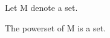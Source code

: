 \begin{forthel}

  Let M denote a set.

  \begin{lemma}
    The powerset of M is a set.
  \end{lemma}

\end{forthel}
